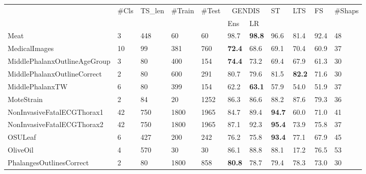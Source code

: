 \documentclass[runningheads]{llncs}
\begin{document}
\begin{table}[t]
	\centering
	\scriptsize
	\begin{tabular}{>{\tiny}lllll|lllll|l}
		\toprule
		\multirow{2}{*}{\scriptsize Dataset} & \multirow{2}{*}{\#Cls} & \multirow{2}{*}{TS\_len} & \multirow{2}{*}{\#Train} & \multirow{2}{*}{\#Test} & \multicolumn{2}{c}{GENDIS} & \multirow{2}{*}{ST} & \multirow{2}{*}{LTS} & \multirow{2}{*}{FS} & \multirow{2}{*}{\#Shaps} \\
		& & & & & Ens & LR & & & & \\ \midrule
		Meat                           & 3         & 448       & 60      & 60     & 98.7 & \textbf{98.8}  & 96.6           & 81.4          & 92.4  & 48          \\
		MedicalImages                  & 10        & 99        & 381     & 760    & \textbf{72.4} & 68.6  & 69.1           & 70.4          & 60.9  & 37          \\
		MiddlePhalanxOutlineAgeGroup   & 3         & 80        & 400     & 154    & \textbf{74.4} & 73.2  & 69.4           & 67.9          & 61.3  & 30          \\
		MiddlePhalanxOutlineCorrect    & 2         & 80        & 600     & 291    & 80.7 & 79.6          & 81.5           & \textbf{82.2} & 71.6  & 30          \\
		MiddlePhalanxTW                & 6         & 80        & 399     & 154    & 62.2 & \textbf{63.1}  & 57.9           & 54.0          & 51.9  & 37          \\
		MoteStrain                     & 2         & 84        & 20      & 1252   & 86.3 & 86.6          & 88.2           & 87.6          & 79.3  & 36          \\
		NonInvasiveFatalECGThorax1     & 42        & 750       & 1800    & 1965   & 84.7 & 89.4          & \textbf{94.7}  & 60.0          & 71.0  & 41          \\
		NonInvasiveFatalECGThorax2     & 42        & 750       & 1800    & 1965   & 87.1 & 92.3          & \textbf{95.4}  & 73.9          & 75.8  & 37          \\
		OSULeaf                        & 6         & 427       & 200     & 242    & 76.2 & 75.8           & \textbf{93.4}  & 77.1          & 67.9  & 45          \\
		OliveOil                       & 4         & 570       & 30      & 30     & 86.1 & 88.8          & 88.1           & 17.2          & 76.5  & 53          \\
		PhalangesOutlinesCorrect       & 2         & 80        & 1800    & 858    & \textbf{80.8} & 78.7  & 79.4           & 78.3          & 73.0  & 30          \\

\end{tabular}
\end{table}
\end{document}
